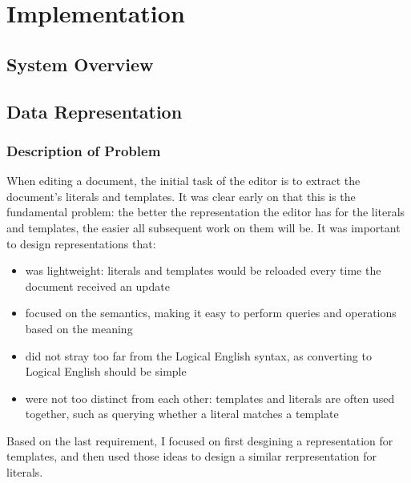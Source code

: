 \documentclass[../main.tex]{subfiles}
\begin{document}
\chapter{Implementation}
\section{System Overview}

\section{Data Representation}
\subsection{Description of Problem}
When editing a document, the initial task of the editor is to extract the document's literals and templates. It was clear early on that this is the fundamental problem: the better the representation the editor has for the literals and templates, the easier all subsequent work on them will be. It was important to design representations that:
\begin{itemize}
    \item was lightweight: literals and templates would be reloaded every time the document received an update
    \item focused on the semantics, making it easy to perform queries and operations based on the meaning
    \item did not stray too far from the Logical English syntax, as converting to Logical English should be simple
    \item were not too distinct from each other: templates and literals are often used together, such as querying whether a literal matches a template
\end{itemize}
Based on the last requirement, I focused on first desgining a representation for templates, and then used those ideas to design a similar rerpresentation for literals. 
\end{document}
